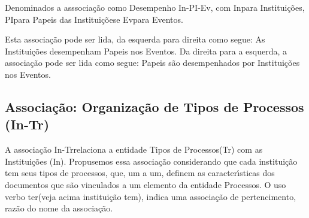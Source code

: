 \documentclass[
12pt,		%
openright,	%
twoside,  %
a4paper,			%
chapter=TITLE,		%
english,			%
french,				%
spanish,			%
brazil				%
]{USPSC-classe/USPSC}
\begin{document}

Denominados a asssocia\c{c}\~ao como \textquotedbl Desempenho In-PI-Ev\textquotedbl , com \textquotedbl In\textquotedbl  para Institui\c{c}\~oes, \textquotedbl PI\textquotedbl  para \textquotedbl Papeis das Institui\c{c}\~oes\textquotedbl  e \textquotedbl Ev\textquotedbl  para \textquotedbl Eventos\textquotedbl .









Esta associa\c{c}\~ao pode ser lida, da esquerda para direita como segue: \textquotedbl As Institui\c{c}\~oes desempenham Papeis nos Eventos\textquotedbl . Da direita para a esquerda, a associa\c{c}\~ao pode ser lida como segue: \textquotedbl Papeis s\~ao desempenhados por Institui\c{c}\~oes nos Eventos\textquotedbl .









\subsection[Associa\c{c}\~ao: Organiza\c{c}\~ao de Tipos de Processos (In-Tr)]{Associa\c{c}\~ao: Organiza\c{c}\~ao de Tipos de Processos (In-Tr)}\label{Associa\c{c}\~ao: Organiza\c{c}\~ao de Tipos de Processos (In-Tr)}
A associa\c{c}\~ao \textquotedbl In-Tr\textquotedbl  relaciona a entidade \textquotedbl Tipos de Processos\textquotedbl  (Tr) com as Institui\c{c}\~oes (In). Propusemos essa associa\c{c}\~ao considerando que cada institui\c{c}\~ao tem seus tipos de processos, que, um a um, definem as caracter\'{\i}sticas dos documentos que s\~ao vinculados a um elemento da entidade \textquotedbl Processos\textquotedbl . O uso verbo \textquotedbl ter\textquotedbl  (veja acima \textquotedbl institui\c{c}\~ao tem\textquotedbl ), indica uma associa\c{c}\~ao de pertencimento, raz\~ao do nome da associa\c{c}\~ao.
\end{document}
